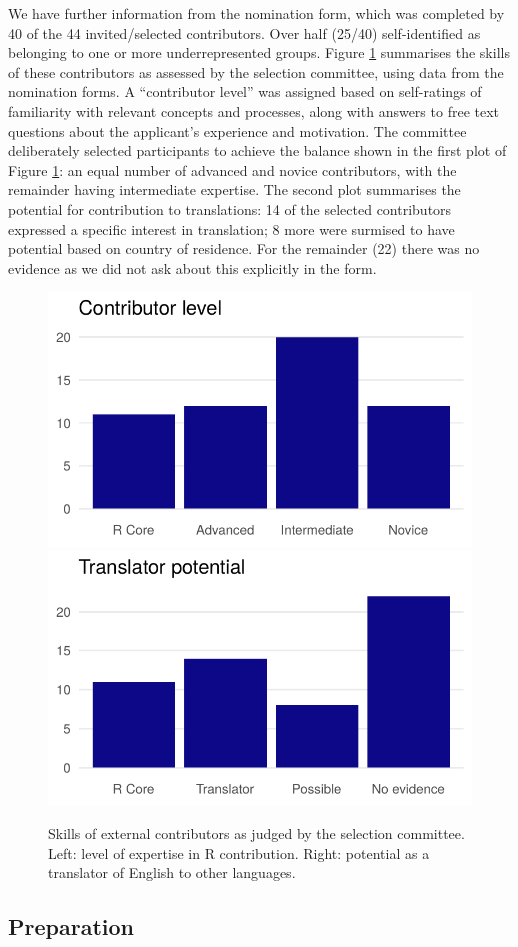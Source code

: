 We have further information from the nomination form, which was completed by 40 of the 44 invited/selected contributors. Over half (25/40) self-identified as belonging to one or more underrepresented groups. Figure \ref{fig:skills} summarises the skills of these contributors as assessed by the selection committee, using data from the nomination forms. A ``contributor level'' was assigned based on self-ratings of familiarity with relevant concepts and processes, along with answers to free text questions about the applicant's experience and motivation.
The committee deliberately selected participants to achieve the balance shown in
the first plot of Figure \ref{fig:skills}: an equal number of advanced and
novice contributors, with the remainder having intermediate expertise. The second
plot summarises the potential for contribution to translations: 14 of
the selected contributors expressed a specific interest in translation; 8 more
were surmised to have potential based on country of residence. For the
remainder (22) there was no evidence as we did not ask about this explicitly in the form.

\begin{figure}
\includegraphics[width=0.5\linewidth]{figures/contributor_level} \includegraphics[width=0.5\linewidth]{figures/translator_level} \caption{Skills of external contributors as judged by the selection committee. Left: level of expertise in R contribution. Right: potential as a translator of English to other languages.}\label{fig:skills}
\end{figure}

\hypertarget{preparation}{%
\subsection{Preparation}\label{preparation}}

